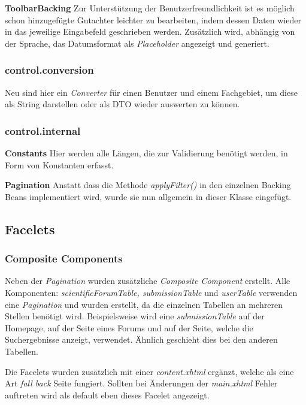 \textbf{ToolbarBacking} Zur Unterstützung der Benutzerfreundlichkeit ist es möglich schon hinzugefügte Gutachter leichter zu bearbeiten, indem dessen Daten wieder in das jeweilige Eingabefeld geschrieben werden. Zusätzlich wird, abhängig von der Sprache, das Datumsformat als \emph{Placeholder} angezeigt und generiert.

\subsubsection{control.conversion}

Neu sind hier ein \emph{Converter} für einen Benutzer und einem Fachgebiet, um diese als String darstellen oder als DTO wieder auswerten zu können.

\subsubsection{control.internal}

\textbf{Constants} Hier werden alle Längen, die zur Validierung benötigt werden, in Form von Konstanten erfasst.

\textbf{Pagination} Anstatt dass die Methode \emph{applyFilter()} in den einzelnen Backing Beans implementiert wird, wurde sie nun allgemein in dieser Klasse eingefügt.



\subsection{Facelets}

\subsubsection{Composite Components}

Neben der \emph{Pagination} wurden zusätzliche \emph{Composite Component} erstellt. Alle Komponenten: \emph{scientificForumTable, submissionTable} und \emph{userTable} verwenden eine  \emph{Pagination} und wurden erstellt, da die einzelnen Tabellen an mehreren Stellen benötigt wird. Beispielsweise wird eine \emph{submissionTable} auf der Homepage, auf der Seite eines Forums und auf der Seite, welche die Suchergebnisse anzeigt, verwendet. Ähnlich geschieht dies bei den anderen Tabellen.

Die Facelets wurden zusätzlich mit einer \emph{content.xhtml} ergänzt, welche als eine Art \emph{fall back} Seite fungiert. Sollten  bei Änderungen der \emph{main.xhtml} Fehler auftreten wird als default eben dieses Facelet angezeigt.

